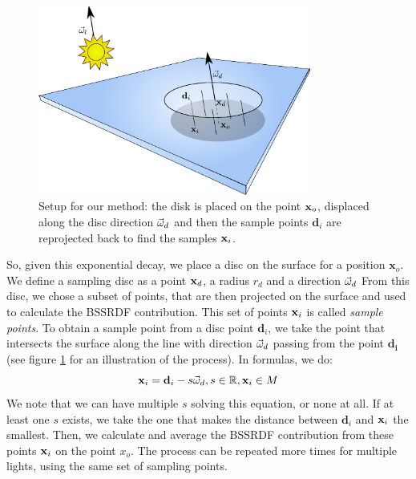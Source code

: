 \begin{figure}
\centering
\includegraphics[width=0.8\textwidth]{images/disk_setup.pdf}
\caption{Setup for our method: the disk is placed on the point $\mathbf{x}_o$, displaced along the disc direction $\vec{\omega}_d$ and then the sample points $\mathbf{d}_i$ are reprojected back to find the samples $\mathbf{x}_i$.}
\label{fig:disksetup}
\end{figure}
\FloatBarrier

So, given this exponential decay, we place a disc on the surface for a position $\mathbf{x}_o$. We define a sampling disc as a point $\mathbf{x}_d$, a radius $r_d$ and a direction $\vec{\omega}_d$ From this disc, we chose a subset of points, that are then projected on the surface and used to calculate the BSSRDF contribution. This set of points $\mathbf{x}_i$ is called \emph{sample points}. To obtain a sample point from a disc point $\mathbf{d}_i$, we take the point that intersects the surface along the line with direction $\vec{\omega}_d$ passing from the point $\mathbf{d_i}$ (see figure \ref{fig:disksetup} for an illustration of the process). In formulas, we do:
\begin{equation*}
\mathbf{x}_i = \mathbf{d}_i - s \vec{\omega}_d, s \in \mathbb{R}, \mathbf{x}_i \in M
\end{equation*}
We note that we can have multiple $s$ solving this equation, or none at all. If at least one $s$ exists, we take the one that makes the distance between $\mathbf{d}_i$ and $\mathbf{x}_i$ the smallest. Then, we calculate and average the BSSRDF contribution from these points $\mathbf{x}_i$ on the point $x_o$. The process can be repeated more times for multiple lights, using the same set of sampling points. 

